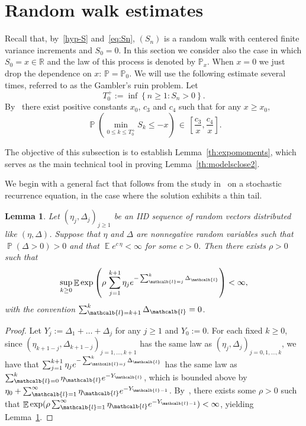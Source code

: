 \documentclass[10pt]{amsart}
\newtheorem{lemm}[theo]{Lemma}\newtheorem{prop}[theo]{Proposition}\newtheorem{coro}[theo]{Corollary}\newtheorem{conj}[theo]{Conjecture}
\theoremstyle{definition}\newtheorem{defi}[theo]{Definition}\newtheorem{rema}[theo]{Remark}\newtheorem{exam}[theo]{Example}\newtheorem{exem}[theo]{Example}\newtheorem{nota}[theo]{Notation}
\newcommand{\bbP}{\mathbb{P}}
\newcommand{\bbR}{\mathbb{R}}
\newcommand{\gD}{\Delta}
\DeclareMathOperator{\p}{\mathbb{P}}
\DeclareMathOperator{\e}{\mathbb{E}}
\renewcommand{\ell}{\mathcalb{l}}
\begin{document}
\section{Random walk estimates}
\label{sec:A}
Recall that, by~\eqref{hyp-S} and~\eqref{eq:Sn}, $(S_n)$ is a random walk with centered finite variance increments and $S_0=0$. In this section we consider also the case in which $S_0=x\in \bbR$ and the law of this process is denoted by $\bbP_x$. When $x=0$ we just drop the dependence on $x$: $\bbP=\bbP_0$. We will use the following estimate several times, referred to as the Gambler's ruin problem. Let
\begin{equation}
T^+_0:= \inf\left\{n\ge 1: S_n >0\right\}.
\end{equation}
By~\cite[Theorem~5.1.7]{cf:LaLi} there exist positive constants $x_0$, $c_3$ and $c_4$ such that for any $x\ge x_0, $
\begin{equation}
\,\p\left(\min_{0\le k\le T^+_0}S_k \le -x \right) \,\in\, \left[\frac{c_3}x, \frac{c_4}x\right].\label{exitproba1}
\end{equation}


The objective of this subsection is to establish Lemma~\ref{th:expomoments}, which serves as the main technical tool in proving Lemma~\ref{th:modelsclose2}.



We begin with a general fact that follows from the study in~\cite{Goldie-Grubel} on a stochastic recurrence equation, in the case where the solution exhibits a thin tail.

\begin{lemm}\label{l:subexpo}
Let $(\eta_j, \Delta_j)_{j\ge 1}$ be an IID sequence of random vectors distributed like $(\eta, \Delta)$. Suppose that $\eta$ and $\Delta$ are nonnegative random variables such that $\p(\Delta>0)>0$ and that $\e e^{c \, \eta }< \infty$ for some $c>0$. Then there exists $\rho>0$ such that
\begin{equation}
\sup_{k\ge 0} \e \exp\left(\rho \, \sum_{j=1}^{k+1} \eta_j e^{- \sum_{\ell=j}^{k} \Delta_\ell} \right)<\infty,
\end{equation}
with the convention $ \sum_{\ell=k+1}^{k} \Delta_\ell=0$.
\end{lemm}

\begin{proof}
Let $Y_j:= \Delta_1+\dots+\Delta_j$ for any $j\ge 1$ and $Y_0:=0$. For each fixed $k\ge 0$, since $(\eta_{k+1-j}, \gD_{k+1-j})_{j=1, \dots, k+1}$ has the same law as $(\eta_j, \gD_j)_{j=0,1, \dots, k}$, we have that $\sum_{j=1}^{k+1} \eta_j e^{- \sum_{\ell=j}^{k} \Delta_\ell}$ has the same law as $\sum_{\ell=0}^k \eta_\ell e^{-Y_\ell} $, which is bounded above by $\eta_0+\sum_{\ell=1}^\infty \eta_\ell e^{-Y_{\ell-1} } $. By~\cite[Theorem~2.1]{Goldie-Grubel}, there exists some $\rho>0$ such that $\e \exp(\rho \sum_{\ell=1}^\infty \eta_\ell e^{-Y_{\ell-1} }) < \infty$, yielding Lemma~\ref{l:subexpo}.
\end{proof}
\end{document}
